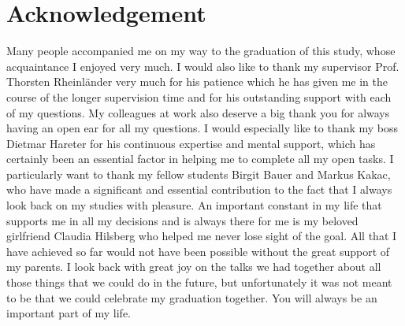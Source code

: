 

\chapter*{Acknowledgement}
\label{cha:Acknowledgement}
Many people accompanied me on my way to the graduation of this study, whose acquaintance I enjoyed very much. 
I would also like to thank my supervisor Prof. Thorsten Rheinländer very much for his patience which he has given me in the course of the longer supervision time and for his outstanding support with each of my questions.
My colleagues at work also deserve a big thank you for always having an open ear for all my questions. I would especially like to thank my boss Dietmar Hareter for his continuous expertise and mental support, which has certainly been an essential factor in helping me to complete all my open tasks. 
I particularly want to thank my fellow students Birgit Bauer and Markus Kakac, who have made a significant and essential contribution to the fact that I always look back on my studies with pleasure. 
An important constant in my life that supports me in all my decisions and is always there for me is my beloved girlfriend Claudia Hilsberg who helped me never lose sight of the goal.
All that I have achieved so far would not have been possible without the great support of my parents. I look back with great joy on the talks we had together about all those things that we could do in the future, but unfortunately it was not meant to be that we could celebrate my graduation together. You will always be an important part of my life. 

